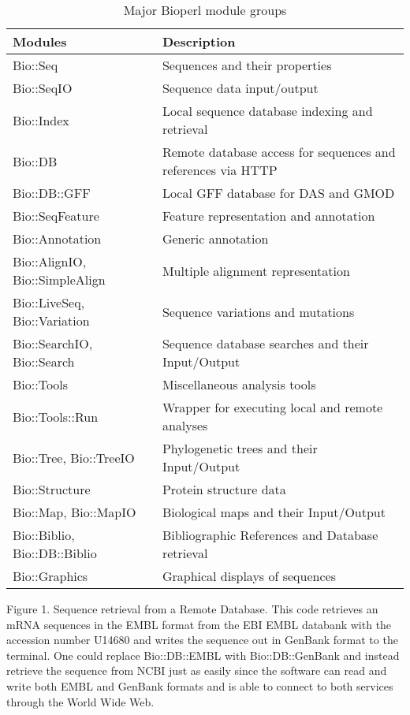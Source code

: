 \documentclass[12pt]{article}
\begin{document}
\begin{table}[h]
\begin{tabular}{|l|l|}
\hline
\textbf{Modules} & \textbf{Description} \\
\hline
Bio::Seq &  Sequences and their properties \\
Bio::SeqIO & Sequence data input/output \\
Bio::Index & Local sequence database indexing and retrieval \\ 
Bio::DB & Remote database access for sequences and references via HTTP \\
Bio::DB::GFF & Local GFF database for DAS and GMOD \\
Bio::SeqFeature & Feature representation and annotation \\
Bio::Annotation & Generic annotation \\
Bio::AlignIO, Bio::SimpleAlign & Multiple alignment representation \\
Bio::LiveSeq, Bio::Variation & Sequence variations and mutations \\
Bio::SearchIO, Bio::Search  & Sequence database searches and their Input/Output \\
Bio::Tools &  Miscellaneous analysis tools \\
Bio::Tools::Run &  Wrapper for executing local and remote analyses \\
Bio::Tree, Bio::TreeIO & Phylogenetic trees and their Input/Output  \\
Bio::Structure & Protein structure data \\
Bio::Map, Bio::MapIO & Biological maps and their Input/Output \\
Bio::Biblio, Bio::DB::Biblio & Bibliographic References and Database
retrieval \\ 
Bio::Graphics & Graphical displays of sequences \\
\hline
\end{tabular}
\caption{Major Bioperl module groups}
\label{modules}
\end{table}

\newpage


Figure 1. Sequence retrieval from a Remote Database.
This code retrieves an mRNA sequences in the EMBL format from the EBI
EMBL databank with the accession number U14680 and writes the sequence
out in GenBank format to the terminal.  One could replace Bio::DB::EMBL
with Bio::DB::GenBank and instead retrieve the sequence from NCBI just
as easily since the software can read and write both EMBL and GenBank
formats and is able to connect to both services through the World Wide
Web.
\end{document}
